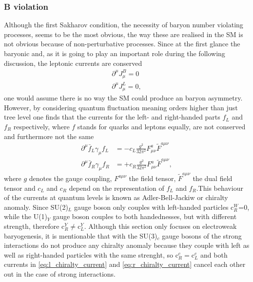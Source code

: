 \subsubsection{B violation}
Although the first Sakharov condition, the necessity of baryon number violating processes, seems to be the most obvious, the way these are realised in the SM is not obvious because of non-perturbative processes. \newline\indent
Since at the first glance the baryonic and, as it is going to play an important role during the following discussion, the leptonic currents are  conserved
\begin{align}
	\partial^\mu J_\mu^B=0
	\label{eq:Bcurrent}
	\\
	\partial^\mu J_\mu^L=0,
	\label{eq:Lcurrent}
\end{align}
one would assume there is no way the SM could produce an baryon asymmetry. However, by considering quantum fluctuation meaning orders higher than just tree level one finds that the currents for the left- and right-handed parts $f_L$ and $f_R$ respectively, where $f$ stands for quarks and leptons equally, are not conserved and furthermore not the same \cite{Bernreuther:2002uj}
\begin{align}
	\partial^\mu\bar{f}_L\gamma_\mu f_L&=-c_L\frac{g^2}{32\pi^2}F^a_{\mu\nu}\tilde{F}^{a\mu\nu}
	\label{eq:l_chiralty_current}
	\\
	\partial^\mu\bar{f}_R\gamma_\mu f_R&=+c_R\frac{g^2}{32\pi^2}F^a_{\mu\nu}\tilde{F}^{a\mu\nu},
	\label{eq:r_chiralty_current}
\end{align}
where $g$ denotes the gauge coupling, $F^{a\mu\nu}$ the field tensor, $\tilde{F}^{a\mu\nu}$ the dual field tensor and $c_L$ and $c_R$ depend on the representation of $f_L$ and $f_R$.This behaviour of the currents at quantum levels is known as Adler-Bell-Jackiw or chiralty anomaly. 
Since SU(2)$_L$ gauge boson only couples with left-handed particles c$_R^W$=0, while the U(1)$_Y$ gauge boson couples to both handednesses, but with different strength, therefore c$_R^Y\neq$c$_L^Y$. Although this section only focuses on electroweak baryogenesis, it is mentionable that with the SU(3)$_c$ gauge bosons of the strong interactions do not produce any chiralty anomaly because they couple with left as well as right-handed particles with the same strenght, so c$_R^c=$c$_L^c$ and both currents in \eqref{eq:l_chiralty_current} and \eqref{eq:r_chiralty_current} cancel each other out in the case of strong interactions. \newline\indent
